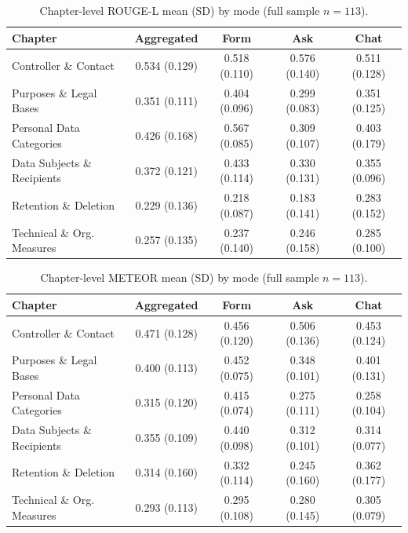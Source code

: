\begin{table}[H]
\centering
\small
\setlength{\tabcolsep}{4pt}
\begin{tabular}{@{}l c c c c@{}}
\toprule
Chapter & Aggregated & Form & Ask & Chat \\
\midrule
Controller \& Contact         & 0.534 (0.129) & 0.518 (0.110) & 0.576 (0.140) & 0.511 (0.128) \\
Purposes \& Legal Bases       & 0.351 (0.111) & 0.404 (0.096) & 0.299 (0.083) & 0.351 (0.125) \\
Personal Data Categories      & 0.426 (0.168) & 0.567 (0.085) & 0.309 (0.107) & 0.403 (0.179) \\
Data Subjects \& Recipients   & 0.372 (0.121) & 0.433 (0.114) & 0.330 (0.131) & 0.355 (0.096) \\
Retention \& Deletion         & 0.229 (0.136) & 0.218 (0.087) & 0.183 (0.141) & 0.283 (0.152) \\
Technical \& Org. Measures    & 0.257 (0.135) & 0.237 (0.140) & 0.246 (0.158) & 0.285 (0.100) \\
\bottomrule
\end{tabular}
\caption{Chapter-level ROUGE-L mean (SD) by mode (full sample
$n = 113$).}
\label{tab:nlp-chapter-rougeL}
\end{table}

\begin{table}[H]
\centering
\small
\setlength{\tabcolsep}{4pt}
\begin{tabular}{@{}l c c c c@{}}
\toprule
Chapter & Aggregated & Form & Ask & Chat \\
\midrule
Controller \& Contact         & 0.471 (0.128) & 0.456 (0.120) & 0.506 (0.136) & 0.453 (0.124) \\
Purposes \& Legal Bases       & 0.400 (0.113) & 0.452 (0.075) & 0.348 (0.101) & 0.401 (0.131) \\
Personal Data Categories      & 0.315 (0.120) & 0.415 (0.074) & 0.275 (0.111) & 0.258 (0.104) \\
Data Subjects \& Recipients   & 0.355 (0.109) & 0.440 (0.098) & 0.312 (0.101) & 0.314 (0.077) \\
Retention \& Deletion         & 0.314 (0.160) & 0.332 (0.114) & 0.245 (0.160) & 0.362 (0.177) \\
Technical \& Org. Measures    & 0.293 (0.113) & 0.295 (0.108) & 0.280 (0.145) & 0.305 (0.079) \\
\bottomrule
\end{tabular}
\caption{Chapter-level METEOR mean (SD) by mode (full sample
$n = 113$).}
\label{tab:nlp-chapter-meteor}
\end{table}

